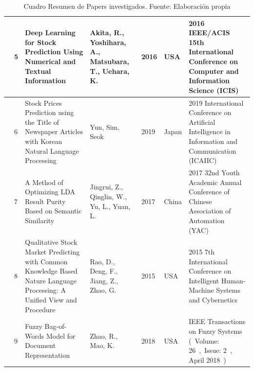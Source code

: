 \begin{table}[h]
\begin{tabular}{|m{0.5cm}|m{0.3cm}|m{4cm}|m{2cm}|m{0.6cm}|m{1.7cm}|m{3cm}|}
		\cline{2-7}
		& 5                                             & Deep Learning for Stock Prediction Using Numerical and Textual
		Information                                               & Akita, R., Yoshihara, A., Matsubara, T.,  Uehara, K. & 2016                                        & USA                                          & 2016 IEEE/ACIS 15th International Conference on Computer and
		Information Science (ICIS)             \\ 
		\hline
		\multirow{4}{*}[-28ex]{\rotcell{\rlap{Técnica}}}                                          & 6                                             & Stock Prices Prediction using the Title of Newspaper Articles
		with Korean Natural Language Processing~                   & Yun, Sim,  Seok                                      & 2019                                        & Japan                                        & 2019 International Conference on Artificial Intelligence in
		Information and Communication (ICAIIC)  \\ 
		\cline{2-7}
		& 7                                             & A Method of Optimizing LDA Result Purity Based on Semantic
		Similarity                                                    & Jingrui, Z., Qinglin, W., Yu, L.,  Yuan, L.          & 2017                                        & China                                        & 2017 32nd Youth Academic Annual Conference of Chinese
		Association of Automation (YAC)~              \\ 
		\cline{2-7}
		& 8                                             & Qualitative Stock Market Predicting with Common Knowledge Based
		Nature Language Processing: A Unified View and Procedure & Rao, D., Deng, F., Jiang, Z.,  Zhao, G.~             & 2015                                        & USA                                          & 2015 7th International Conference on Intelligent Human-Machine
		Systems and Cybernetics              \\ 
		\cline{2-7}
		& 9                                             & Fuzzy Bag-of-Words Model for Document Representation                                                                       & Zhao, R.,  Mao, K.                                   & 2018                                        & USA                                          & IEEE Transactions on Fuzzy Systems (~Volume:
		26~,~Issue: 2~, April 2018~)                           \\
		\hline
	\end{tabular}
	\caption{Cuadro Resumen de Papers investigados. Fuente: Elaboración propia}
\label{A:table}
\end{table}



